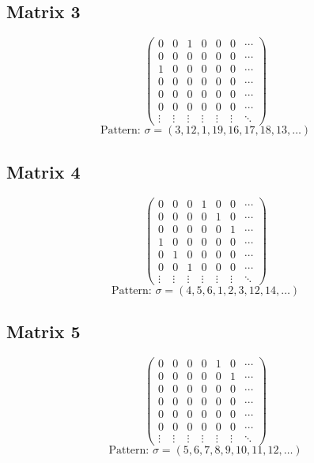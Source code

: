 \documentclass{article}
\begin{document}
\subsection*{Matrix 3}
\[
\begin{pmatrix}
  0 & 0 & 1 & 0 & 0 & 0 & \cdots \\
  0 & 0 & 0 & 0 & 0 & 0 & \cdots \\
  1 & 0 & 0 & 0 & 0 & 0 & \cdots \\
  0 & 0 & 0 & 0 & 0 & 0 & \cdots \\
  0 & 0 & 0 & 0 & 0 & 0 & \cdots \\
  0 & 0 & 0 & 0 & 0 & 0 & \cdots \\
\vdots & \vdots & \vdots & \vdots & \vdots & \vdots & \ddots
\end{pmatrix}
\]
\[
\text{Pattern: } \sigma = (3, 12, 1, 19, 16, 17, 18, 13, \ldots)
\]
\vspace{0.5em}

\subsection*{Matrix 4}
\[
\begin{pmatrix}
  0 & 0 & 0 & 1 & 0 & 0 & \cdots \\
  0 & 0 & 0 & 0 & 1 & 0 & \cdots \\
  0 & 0 & 0 & 0 & 0 & 1 & \cdots \\
  1 & 0 & 0 & 0 & 0 & 0 & \cdots \\
  0 & 1 & 0 & 0 & 0 & 0 & \cdots \\
  0 & 0 & 1 & 0 & 0 & 0 & \cdots \\
\vdots & \vdots & \vdots & \vdots & \vdots & \vdots & \ddots
\end{pmatrix}
\]
\[
\text{Pattern: } \sigma = (4, 5, 6, 1, 2, 3, 12, 14, \ldots)
\]
\vspace{0.5em}

\subsection*{Matrix 5}
\[
\begin{pmatrix}
  0 & 0 & 0 & 0 & 1 & 0 & \cdots \\
  0 & 0 & 0 & 0 & 0 & 1 & \cdots \\
  0 & 0 & 0 & 0 & 0 & 0 & \cdots \\
  0 & 0 & 0 & 0 & 0 & 0 & \cdots \\
  0 & 0 & 0 & 0 & 0 & 0 & \cdots \\
  0 & 0 & 0 & 0 & 0 & 0 & \cdots \\
\vdots & \vdots & \vdots & \vdots & \vdots & \vdots & \ddots
\end{pmatrix}
\]
\[
\text{Pattern: } \sigma = (5, 6, 7, 8, 9, 10, 11, 12, \ldots)
\]
\vspace{0.5em}
\end{document}
